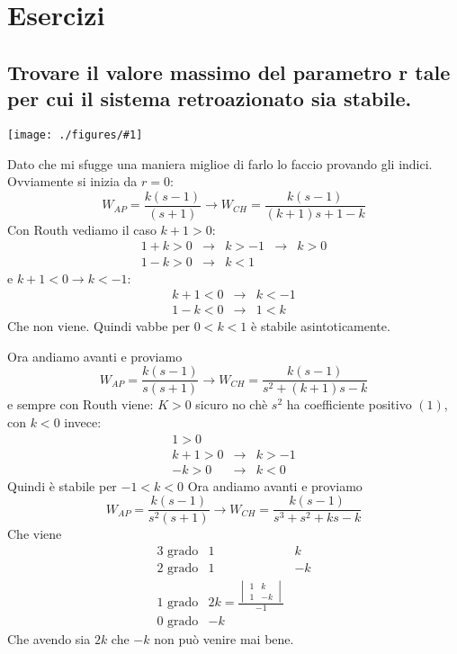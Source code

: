 \documentclass{article}
\newcommand{\incfig}[2]{%
	\texttt{[image: ./figures/\#1]}%
}
\begin{document}
\section{Esercizi}

\subsection{Trovare il valore massimo del parametro r tale per cui il sistema retroazionato sia stabile. }

\incfig{sistema.jpeg}{1.2}

Dato che mi sfugge una maniera miglioe di farlo lo faccio provando gli indici. Ovviamente si inizia da $r=0$:
\[ 
    W_{AP} = \frac{k(s-1)}{(s+1)} \to W_{CH} = \frac{k(s-1)}{(k+1)s+1-k}
\]
Con Routh vediamo il caso $k+1>0$:
\begin{align*}
    1+k >0 &\to& k>-1&\to& k >0\\
    1-k >0 &\to& k<1
\end{align*}
e $k+1 < 0\to k <-1$:
\begin{align*}
    k+1 <0 &\to& k < -1\\
    1-k <0 &\to& 1<k 
\end{align*} 
Che non viene.
Quindi vabbe per $0<k<1$ è stabile asintoticamente.

Ora andiamo avanti e proviamo 
\[ 
    W_{AP} = \frac{k(s-1)}{s(s+1)} \to W_{CH} = \frac{k(s-1)}{s^2+(k+1)s-k}
\]
e sempre con Routh viene:
$K>0$ sicuro no chè $s^2$ ha coefficiente positivo $(1)$, con $k<0$ invece:
\begin{align*}
    1>0\\
    k+1>0 &\to& k>-1\\
    -k>0 &\to& k <0
\end{align*}
Quindi è stabile per $-1<k<0$
Ora andiamo avanti e proviamo 
\[ 
    W_{AP} = \frac{k(s-1)}{s^2(s+1)} \to W_{CH} = \frac{k(s-1)}{s^3+s^2+ks-k}
\]
Che viene 
\begin{align*}
    3\text{ grado}&1&k\\
    2\text{ grado}&1&-k\\
    1\text{ grado}& 2k= \frac{\begin{vmatrix}
    1 & k \\
    1 & -k
    \end{vmatrix}}{-1} \\
    0\text{ grado}&-k
\end{align*}
Che avendo sia $2k$ che $-k$ non può venire mai bene.
\end{document}
